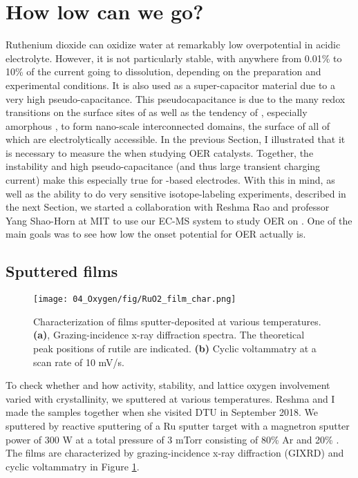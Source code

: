 
\section{How low can we go?}\label{sec:low_O2}

Ruthenium dioxide can oxidize water at remarkably low overpotential in acidic electrolyte\cite{Miles1976, Reier2017}. However, it is not particularly stable, with anywhere from 0.01\% to 10\% of the current going to  dissolution, depending on the preparation and experimental conditions\cite{Roy2018}. It is also used as a super-capacitor material\cite{Gonzalez2016} due to a very high pseudo-capacitance. This pseudocapacitance is due to the many redox transitions on the surface sites of  as well as the tendency of , especially amorphous , to form nano-scale interconnected domains, the surface of all of which are electrolytically accessible\cite{Yoshida2013}. In the previous Section, I illustrated that it is necessary to measure the  when studying OER catalysts. Together, the instability and high pseudo-capacitance (and thus large transient charging current) make this especially true for -based electrodes. With this in mind, as well as the ability to do very sensitive isotope-labeling experiments, described in the next Section, we started a collaboration with Reshma Rao and professor Yang Shao-Horn at MIT to use our EC-MS system to study OER on . One of the main goals was to see how low the onset potential for OER actually is.

\subsection{Sputtered  films}

\begin{figure}[h!]
	\centering
	\texttt{[image: 04\_Oxygen/fig/RuO2\_film\_char.png]}
	\caption{Characterization of  films sputter-deposited at various temperatures. \textbf{(a)}, Grazing-incidence x-ray diffraction spectra. The theoretical peak positions of rutile  are indicated. \textbf{(b)} Cyclic voltammatry at a scan rate of 10 mV/s.}
	\label{fig:RuO2_char}
\end{figure}

To check whether and how activity, stability, and lattice oxygen involvement varied with crystallinity, we sputtered  at various temperatures. Reshma and I made the samples together when she visited DTU in September 2018. We sputtered  by reactive sputtering of a Ru sputter target with a magnetron sputter power of 300 W at a total pressure of 3 mTorr consisting of 80\% Ar and 20\% . The films are characterized by grazing-incidence x-ray diffraction (GIXRD) and cyclic voltammatry in Figure \ref{fig:RuO2_char}.

